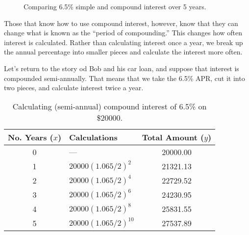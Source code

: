 \begin{figure}[!htbp]
\centering
{}
\caption{Comparing 6.5\% simple and compound interest over 5 years.}
\label{fig:simplecompoundcomparison}
\end{figure}

Those that know how to use compound interest, however, know that they can change what is known as the ``period of compounding.'' This changes how often interest is calculated. Rather than calculating interest once a year, we break up the annual percentage into smaller pieces and calculate the interest more often.

Let's return to the story od Bob and his car loan, and suppose that interest is compounded semi-annually. That means that we take the 6.5\% APR, cut it into two pieces, and calculate interest twice a year.

\begin{table}[!htbp]
\centering
\begin{tabular}{clc}
No. Years ($x$) & Calculations & Total Amount ($y$)\\\hline
0 & --- & 20000.00\\
1 		& $20000(1.065/2)^2$	 & 21321.13\\
2 		& $20000(1.065/2)^4$	 & 22729.52\\
3 		& $20000(1.065/2)^6$	 & 24230.95\\
4 		& $20000(1.065/2)^8$	 & 25831.55\\
5 		& $20000(1.065/2)^{10}$	 & 27537.89\\
\end{tabular}
\caption{Calculating (semi-annual) compound interest of 6.5\% on \$20000.}
\label{table:bobsemiannual}
\end{table}

